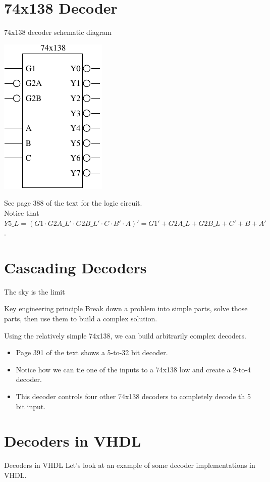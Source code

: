 \section{74x138 Decoder}

\begin{frame}{74x138 decoder schematic diagram}
  \begin{center}
    \includegraphics{74x138Schematic}
  \end{center}
\end{frame}

See page 388 of the text for the logic circuit.\\

Notice that $Y5\_L = (G1 \cdot G2A\_L' \cdot G2B\_L' \cdot C \cdot B' \cdot A)' = G1' + G2A\_L + G2B\_L + C' + B + A'$.

\section{Cascading Decoders}

\begin{frame}{The sky is the limit}
  \begin{block}{Key engineering principle}
    Break down a problem into simple parts, solve those parts, then use them to build a complex solution.
  \end{block}
  Using the relatively simple 74x138, we can build arbitrarily complex decoders.
  \begin{itemize}
    \item Page 391 of the text shows a 5-to-32 bit decoder.
    \item Notice how we can tie one of the inputs to a 74x138 low and create a 2-to-4 decoder.
    \item This decoder controls four other 74x138 decoders to completely decode th 5 bit input.
  \end{itemize}
\end{frame}

\section{Decoders in VHDL}

\begin{frame}{Decoders in VHDL}
  Let's look at an example of some decoder implementations in VHDL.
\end{frame}


